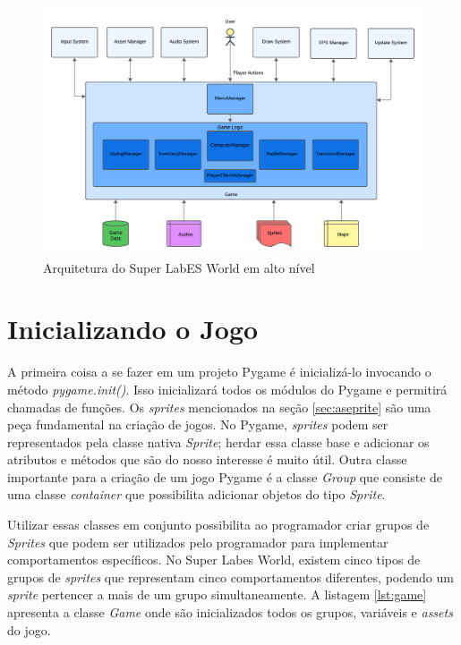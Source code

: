 \begin{figure}[h!]
    \centering
    \includegraphics[width=1\linewidth]{figuras/game-architecture.png}
    \caption{Arquitetura do Super LabES World em alto nível}
    \label{fig:game-architecture}
\end{figure}

\clearpage
\section{Inicializando o Jogo}
\label{sec:principais-funcoes}
A primeira coisa a se fazer em um projeto Pygame é inicializá-lo invocando o método \textit{pygame.init()}. Isso inicializará todos os módulos do Pygame e permitirá chamadas de funções. Os \textit{sprites} mencionados na seção \ref{sec:aseprite} são uma peça fundamental na criação de jogos. No Pygame, \textit{sprites} podem ser representados pela classe nativa \textit{Sprite}; herdar essa classe base e adicionar os atributos e métodos que são do nosso interesse é muito útil. Outra classe importante para a criação de um jogo Pygame é a classe \textit{Group} que consiste de uma classe \textit{container} que possibilita adicionar objetos do tipo \textit{Sprite}. 

Utilizar essas classes em conjunto possibilita ao programador criar grupos de \textit{Sprites} que podem ser utilizados pelo programador para implementar comportamentos específicos. No Super Labes World, existem cinco tipos de grupos de \textit{sprites} que representam cinco comportamentos diferentes, podendo um \textit{sprite} pertencer a mais de um grupo simultaneamente. A listagem \ref{lst:game} apresenta a classe \textit{Game} onde são inicializados todos os grupos, variáveis e \textit{assets} do jogo.


